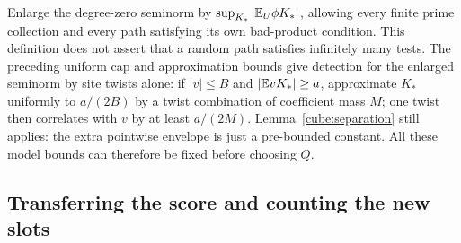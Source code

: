 Enlarge the degree-zero seminorm by
$\sup_{K_*}|\mathbb E_U\phi K_*|$, allowing every finite prime collection
and every path satisfying its own bad-product condition.  This
definition does not assert that a random path satisfies infinitely
many tests.  The preceding uniform cap and approximation bounds
give detection for the enlarged seminorm by site twists alone:
if $|v|\le B$ and $|\mathbb E vK_*|\ge a$, approximate $K_*$ uniformly
to $a/(2B)$ by a twist combination of coefficient mass $M$; one
twist then correlates with $v$ by at least $a/(2M)$.
Lemma~\ref{cube:separation} still applies: the extra pointwise
envelope is just a pre-bounded constant.  All these model bounds can
therefore be fixed before choosing $Q$.

\subsection{Transferring the score and counting the new slots}


